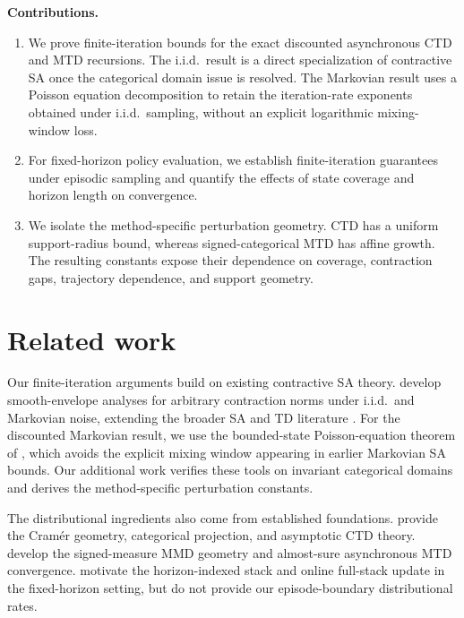 \documentclass{article}
\begin{document}
\noindent\textbf{Contributions.}
\begin{enumerate}[leftmargin=*,labelsep=0.2em, align=left, itemsep=2pt]
    \item We prove finite-iteration bounds for the exact discounted asynchronous CTD and MTD recursions. The i.i.d.\ result is a direct specialization of contractive SA once the categorical domain issue is resolved. The Markovian result uses a Poisson equation decomposition to retain the iteration-rate exponents obtained under i.i.d.\ sampling, without an explicit logarithmic mixing-window loss.
    \item For fixed-horizon policy evaluation, we establish finite-iteration guarantees under episodic sampling and quantify the effects of state coverage and horizon length on convergence.
    \item We isolate the method-specific perturbation geometry. CTD has a uniform support-radius bound, whereas signed-categorical MTD has affine growth. The resulting constants expose their dependence on coverage, contraction gaps, trajectory dependence, and support geometry.
\end{enumerate}

\section{Related work}
Our finite-iteration arguments build on existing contractive SA theory. \citet{chen2020finite,chen2022finite,chen2024lyapunov} develop smooth-envelope analyses for arbitrary contraction norms under i.i.d.\ and Markovian noise, extending the broader SA and TD literature \citep{robbins1951stochastic,ljung2003analysis,borkar2008stochastic,kushner2003stochastic,bhandari2018finite,qu2020finite}. For the discounted Markovian result, we use the bounded-state Poisson-equation theorem of \citet{haque2024stochastic}, which avoids the explicit mixing window appearing in earlier Markovian SA bounds. Our additional work verifies these tools on invariant categorical domains and derives the method-specific perturbation constants.

The distributional ingredients also come from established foundations. \citet{rowland2018analysis,bellemare2023distributional} provide the Cram\'er geometry, categorical projection, and asymptotic CTD theory. \citet{wiltzer2024foundations} develop the signed-measure MMD geometry and almost-sure asynchronous MTD convergence. \citet{de2020fixed} motivate the horizon-indexed stack and online full-stack update in the fixed-horizon setting, but do not provide our episode-boundary distributional rates. 
\end{document}
